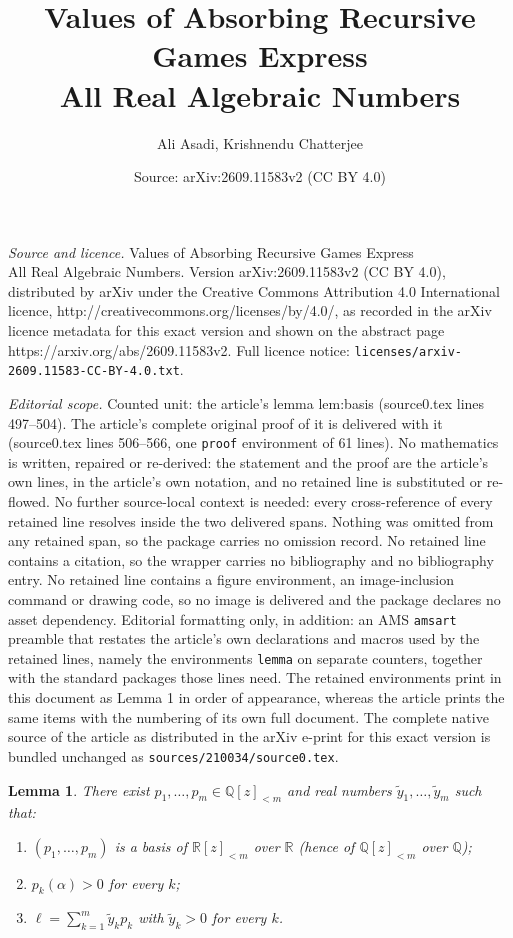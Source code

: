 \documentclass[10pt,a4paper]{amsart}
\title{Values of Absorbing Recursive Games Express\\ All Real Algebraic Numbers}
\author{Ali Asadi, Krishnendu Chatterjee}
\date{Source: arXiv:2609.11583v2 (CC BY 4.0)}
\newtheorem{lemma}{Lemma}
\newcommand{\PP}{\R[z]_{<m}}
\newcommand{\PQ}{\Q[z]_{<m}}
\newcommand{\Q}{\mathbb{Q}}
\newcommand{\R}{\mathbb{R}}
\begin{document}
\maketitle

\noindent\emph{Source and licence.} Values of Absorbing Recursive Games Express\\ All Real Algebraic Numbers. Version arXiv:2609.11583v2 (CC BY 4.0), distributed by arXiv under the Creative Commons Attribution 4.0 International licence, http://creativecommons.org/licenses/by/4.0/, as recorded in the arXiv licence metadata for this exact version and shown on the abstract page https://arxiv.org/abs/2609.11583v2. Full licence notice: \texttt{licenses/arxiv-2609.11583-CC-BY-4.0.txt}.\par\smallskip

\noindent\textit{Editorial scope.} Counted unit: the article's lemma lem:basis (source0.tex lines 497--504). The article's complete original proof of it is delivered with it (source0.tex lines 506--566, one \texttt{proof} environment of 61 lines). No mathematics is written, repaired or re-derived: the statement and the proof are the article's own lines, in the article's own notation, and no retained line is substituted or re-flowed.  No further source-local context is needed: every cross-reference of every retained line resolves inside the two delivered spans.  Nothing was omitted from any retained span, so the package carries no omission record.  No retained line contains a citation, so the wrapper carries no bibliography and no bibliography entry.  No retained line contains a figure environment, an image-inclusion command or drawing code, so no image is delivered and the package declares no asset dependency.  Editorial formatting only, in addition: an AMS \texttt{amsart} preamble that restates the article's own declarations and macros used by the retained lines, namely the environments \texttt{lemma} on separate counters, together with the standard packages those lines need.  The retained environments print in this document as Lemma 1 in order of appearance, whereas the article prints the same items with the numbering of its own full document.  The complete native source of the article as distributed in the arXiv e-print for this exact version is bundled unchanged as \texttt{sources/210034/source0.tex}.
\begin{lemma}\label{lem:basis}
There exist $p_1,\dots,p_m\in\PQ$ and real numbers $\tilde y_1,\dots,\tilde y_m$ such that:
\begin{enumerate}
\item[\emph{(i)}] $(p_1,\dots,p_m)$ is a basis of $\PP$ over $\R$ (hence of $\PQ$ over $\Q$);
\item[\emph{(ii)}] $p_k(\alpha)>0$ for every $k$;
\item[\emph{(iii)}] $\ell=\sum_{k=1}^m\tilde y_kp_k$ with $\tilde y_k>0$ for every $k$.
\end{enumerate}
\end{lemma}
\end{document}
